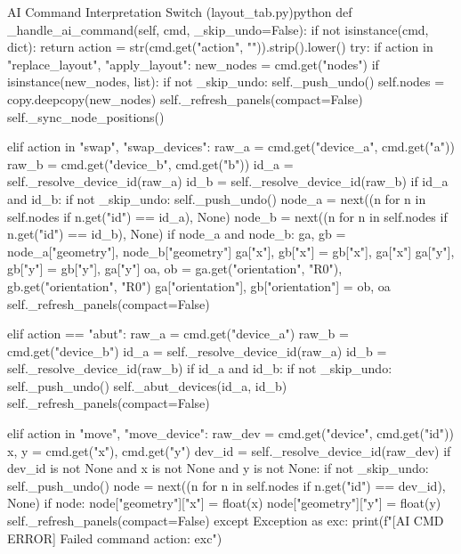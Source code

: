 \begin{thesiscode}{AI Command Interpretation Switch (layout\_tab.py)\label{lst:handle_ai_command}}{python}
def _handle_ai_command(self, cmd, _skip_undo=False):
    if not isinstance(cmd, dict):
        return
    action = str(cmd.get("action", "")).strip().lower()
    try:
        if action in {"replace_layout", "apply_layout"}:
            new_nodes = cmd.get("nodes")
            if isinstance(new_nodes, list):
                if not _skip_undo:
                    self._push_undo()
                self.nodes = copy.deepcopy(new_nodes)
                self._refresh_panels(compact=False)
                self._sync_node_positions()

        elif action in {"swap", "swap_devices"}:
            raw_a = cmd.get("device_a", cmd.get("a"))
            raw_b = cmd.get("device_b", cmd.get("b"))
            id_a = self._resolve_device_id(raw_a)
            id_b = self._resolve_device_id(raw_b)
            if id_a and id_b:
                if not _skip_undo:
                    self._push_undo()
                node_a = next((n for n in self.nodes if n.get("id") == id_a), None)
                node_b = next((n for n in self.nodes if n.get("id") == id_b), None)
                if node_a and node_b:
                    ga, gb = node_a["geometry"], node_b["geometry"]
                    ga["x"], gb["x"] = gb["x"], ga["x"]
                    ga["y"], gb["y"] = gb["y"], ga["y"]
                    oa, ob = ga.get("orientation", "R0"), gb.get("orientation", "R0")
                    ga["orientation"], gb["orientation"] = ob, oa
                    self._refresh_panels(compact=False)

        elif action == "abut":
            raw_a = cmd.get("device_a")
            raw_b = cmd.get("device_b")
            id_a = self._resolve_device_id(raw_a)
            id_b = self._resolve_device_id(raw_b)
            if id_a and id_b:
                if not _skip_undo:
                    self._push_undo()
                self._abut_devices(id_a, id_b)
                self._refresh_panels(compact=False)

        elif action in {"move", "move_device"}:
            raw_dev = cmd.get("device", cmd.get("id"))
            x, y = cmd.get("x"), cmd.get("y")
            dev_id = self._resolve_device_id(raw_dev)
            if dev_id is not None and x is not None and y is not None:
                if not _skip_undo:
                    self._push_undo()
                node = next((n for n in self.nodes if n.get("id") == dev_id), None)
                if node:
                    node["geometry"]["x"] = float(x)
                    node["geometry"]["y"] = float(y)
                    self._refresh_panels(compact=False)
    except Exception as exc:
        print(f"[AI CMD ERROR] Failed command {action}: {exc}")
\end{thesiscode}

